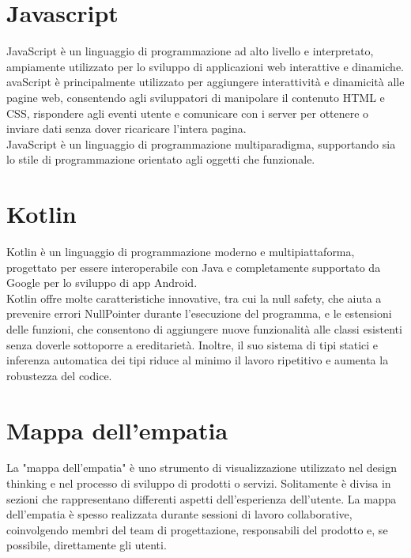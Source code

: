 \documentclass{article}
\begin{document}
\section{Javascript}
JavaScript è un linguaggio di programmazione ad alto livello e interpretato, ampiamente utilizzato per lo sviluppo di applicazioni web interattive e dinamiche.\\
avaScript è principalmente utilizzato per aggiungere interattività e dinamicità alle pagine web, consentendo agli sviluppatori di manipolare il contenuto HTML e CSS, rispondere agli eventi utente e comunicare con i server per ottenere o inviare dati senza dover ricaricare l'intera pagina.\\
JavaScript è un linguaggio di programmazione multiparadigma, supportando sia lo stile di programmazione orientato agli oggetti che funzionale.

\section{Kotlin}
Kotlin è un linguaggio di programmazione moderno e multipiattaforma, progettato per essere interoperabile con Java e completamente supportato da Google per lo sviluppo di app Android.\\
Kotlin offre molte caratteristiche innovative, tra cui la null safety, che aiuta a prevenire errori NullPointer durante l'esecuzione del programma, e le estensioni delle funzioni, che consentono di aggiungere nuove funzionalità alle classi esistenti senza doverle sottoporre a ereditarietà. Inoltre, il suo sistema di tipi statici e inferenza automatica dei tipi riduce al minimo il lavoro ripetitivo e aumenta la robustezza del codice.
 
\section {Mappa dell'empatia}
La "mappa dell'empatia" è uno strumento di visualizzazione utilizzato nel design thinking e nel processo di sviluppo di prodotti o servizi.
Solitamente è divisa in sezioni che rappresentano differenti aspetti dell'esperienza dell'utente.
La mappa dell'empatia è spesso realizzata durante sessioni di lavoro collaborative, coinvolgendo membri del team di progettazione, responsabili del prodotto e, se possibile, direttamente gli utenti.
\end{document}
